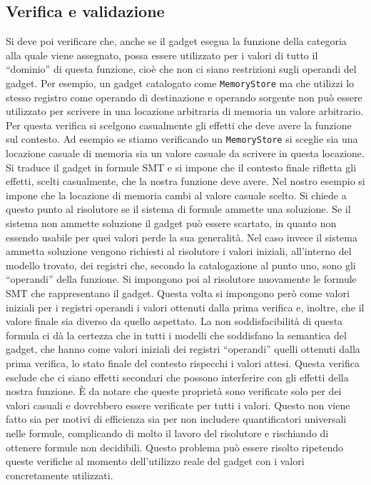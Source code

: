 \begin{inparaenum}[1)]
\subsection{Verifica e validazione}\label{s:verifica_validazione}
Si deve poi verificare che, anche se il gadget esegua la funzione
della categoria alla quale viene assegnato, possa essere utilizzato
per i valori di tutto il ``dominio'' di questa funzione, cioè che non
ci siano restrizioni sugli operandi del gadget. Per esempio, un gadget
catalogato come \lstinline{MemoryStore} ma che utilizzi lo stesso
registro come operando di destinazione e operando sorgente non può
essere utilizzato per scrivere in una locazione arbitraria di memoria
un valore arbitrario. Per questa verifica si scelgono casualmente gli
effetti che deve avere la funzione sul contesto. Ad esempio se stiamo
verificando un \lstinline{MemoryStore} si sceglie sia una locazione
casuale di memoria sia un valore casuale da scrivere in questa
locazione. Si traduce il gadget in formule SMT e si impone che il
contesto finale rifletta gli effetti, scelti casualmente, che la
nostra funzione deve avere. Nel nostro esempio si impone che la
locazione di memoria cambi al valore casuale scelto. Si chiede a
questo punto al risolutore se il sistema di formule ammette una
soluzione. Se il sistema non ammette soluzione il gadget può essere
scartato, in quanto non essendo usabile per quei valori perde la sua
generalità. Nel caso invece il sistema ammetta soluzione vengono
richiesti al risolutore i valori iniziali, all'interno del modello
trovato, dei registri che, secondo la catalogazione al punto uno,
sono gli ``operandi'' della funzione. Si impongono poi al risolutore
nuovamente le formule SMT che rappresentano il gadget.  Questa volta
si impongono però come valori iniziali per i registri operandi i
valori ottenuti dalla prima verifica e, inoltre, che il valore finale
sia diverso da quello aspettato. La non soddisfacibilità di questa
formula ci dà la certezza che in tutti i modelli che soddisfano la
semantica del gadget, che hanno come valori iniziali dei registri
``operandi'' quelli ottenuti dalla prima verifica, lo stato finale del
contesto rispecchi i valori attesi. Questa verifica esclude che ci
siano effetti secondari che possono interferire con gli effetti della
nostra funzione. È da notare che queste proprietà sono verificate solo
per dei valori casuali e dovrebbero essere verificate per tutti i
valori. Questo non viene fatto sia per motivi di efficienza sia per
non includere quantificatori universali nelle formule, complicando di
molto il lavoro del risolutore e rischiando di ottenere formule non
decidibili. Questo problema può essere risolto ripetendo queste
verifiche al momento dell'utilizzo reale del gadget con i valori
concretamente utilizzati.


\end{inparaenum}
